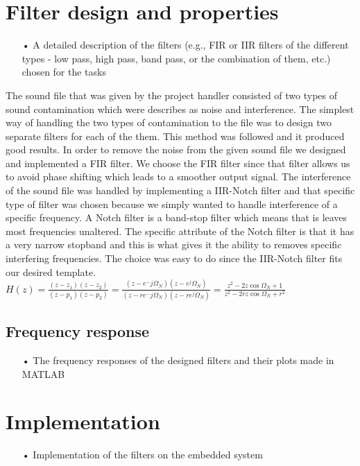 \documentclass[a4paper,11pt]{article}
\begin{document}
\section{Filter design and properties}
\begin{enumerate}
\item[•] A detailed description of the filters (e.g., FIR or IIR filters of the different types - low pass, high pass, band pass, or the combination of them, etc.) chosen for the tasks
\end{enumerate}
The sound file that was given by the project handler consisted of two types of sound contamination which were describes as noise and interference. The simplest way of handling the two types of contamination to the file was to design two separate filters for each of the them. This method was followed and it produced good results. 
In order to remove the noise from the given sound file we designed and implemented a FIR filter. We choose the FIR filter since that filter allows us to avoid phase shifting which leads to a smoother output signal.
The interference of the sound file was handled by implementing a IIR-Notch filter and that specific type of filter was chosen because we simply wanted to handle interference of a specific frequency. A Notch filter is a band-stop filter which means that is leaves most frequencies unaltered. The specific attribute of the Notch filter is that it has a very narrow stopband and this is what gives it the ability to removes specific interfering frequencies. The choice was easy to do since the IIR-Notch filter fits our desired template.  \\

$H(z) =\frac{(z-z_1)(z-z_2)}{(z-p_1)(z-p_2)} = \frac{(z-e^-j\Omega_N)(z-e^j\Omega_N)}{(z-re^-j\Omega_N)(z-re^j\Omega_N)} = \frac{z^2-2z\cos\Omega_N +1}{z^2-2rz\cos\Omega_N + r^2}$

\subsection{Frequency response}
\begin{enumerate}
\item[•] The frequency responses of the designed filters and their plots made in MATLAB
\end{enumerate}


\section{Implementation}
\begin{enumerate}
\item[•] Implementation of the filters on the embedded system
\end{enumerate}
\end{document}
